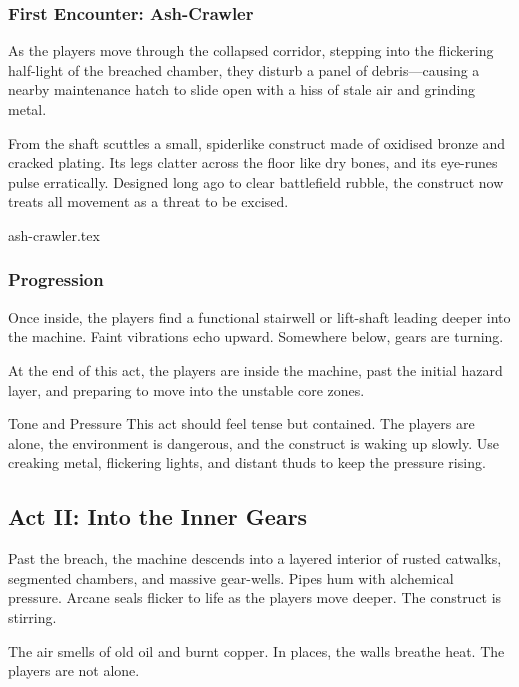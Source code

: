 \subsubsection*{First Encounter: Ash-Crawler}

As the players move through the collapsed corridor, stepping into the flickering half-light of the breached chamber, they disturb a panel of debris—causing a nearby maintenance hatch to slide open with a hiss of stale air and grinding metal.

From the shaft scuttles a small, spiderlike construct made of oxidised bronze and cracked plating. Its legs clatter across the floor like dry bones, and its eye-runes pulse erratically. Designed long ago to clear battlefield rubble, the construct now treats all movement as a threat to be excised.

{ash-crawler.tex}


\subsubsection*{Progression}

Once inside, the players find a functional stairwell or lift-shaft leading deeper into the machine. Faint vibrations echo upward. Somewhere below, gears are turning.

At the end of this act, the players are inside the machine, past the initial hazard layer, and preparing to move into the unstable core zones.

\begin{CommentBox}{Tone and Pressure}
    This act should feel tense but contained. The players are alone, the environment is dangerous, and the construct is waking up slowly. Use creaking metal, flickering lights, and distant thuds to keep the pressure rising.
\end{CommentBox}

\subsection{Act II: Into the Inner Gears}

Past the breach, the machine descends into a layered interior of rusted catwalks, segmented chambers, and massive gear-wells. Pipes hum with alchemical pressure. Arcane seals flicker to life as the players move deeper. The construct is stirring.

The air smells of old oil and burnt copper. In places, the walls breathe heat. The players are not alone.

